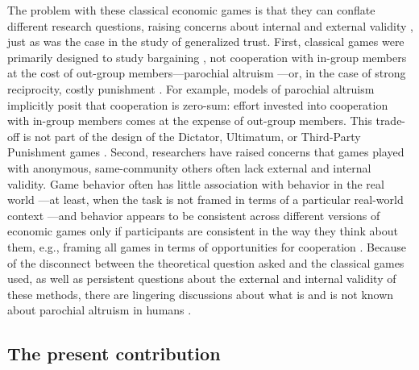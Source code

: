 \documentclass[bibauthoryear]{aa}
\begin{document}
The problem with these classical economic games is that they can conflate different research questions, raising concerns about internal and external validity \citep{Pisor2020, Naar2020}, just as was the case in the study of generalized trust. First, classical games were primarily designed to study bargaining \citep{Camerer1995}, not cooperation with in-group members at the cost of out-group members---parochial altruism \citep[e.g.,][]{yamagishi2016parochial}---or, in the case of strong reciprocity, costly punishment \citep{hagen2006game, guala2012reciprocity}. For example, models of parochial altruism implicitly posit that cooperation is zero-sum: effort invested into cooperation with in-group members comes at the expense of out-group members. This trade-off is not part of the design of the Dictator, Ultimatum, or Third-Party Punishment games \citep[see][for relevant disucssion]{Gil-white2004}. Second, researchers have raised concerns that games played with anonymous, same-community others often lack external and internal validity. Game behavior often has little association with behavior in the real world \citep{gurven2008collective, winking2013natural}---at least, when the task is not framed in terms of a particular real-world context \citep{cronk2007influence, hagen2006game, lesorogol2005experiments, lesorogol2007bringing, pisor2012importing, lightner2017}---and behavior appears to be consistent across different versions of economic games only if participants are consistent in the way they think about them, e.g., framing all games in terms of opportunities for cooperation \citep{yamagishi2013behavioral}. Because of the disconnect between the theoretical question asked and the classical games used, as well as persistent questions about the external and internal validity of these methods, there are lingering discussions about what is and is not known about parochial altruism in humans \citep{Rusch2014,yamagishi2016parochial}.

\subsection{The present contribution}
\end{document}
